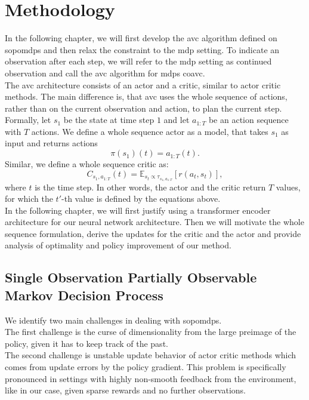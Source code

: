 
\chapter{Methodology}
\label{chapter:Methodology}
In the following chapter, we will first develop the \ac{avc} algorithm defined on \ac{sopomdp}s and then relax 
the constraint to the \ac{mdp} setting. To indicate an observation after each step, we will refer to the \ac{mdp} setting as continued observation 
and call the \ac{avc} algorithm for \ac{mdp}s \ac{coavc}.\\

The \ac{avc} architecture consists of an actor and a critic, similar to actor critic methods. The main difference is, that \ac{avc} uses the whole sequence of 
actions, rather than on the current observation and action, to plan the current step.\\ 

Formally, let $s_{1}$ be the state at time step $1$ and let $a_{1:T}$ be an action sequence with $T$ actions. 
We define a whole sequence actor as a model, that takes $s_{1}$ as input and returns actions 
\begin{equation}
    \label{eq:def_wsa}
    \pi(s_{1})(t) = a_{1:T}(t).
\end{equation}
Similar, we define a whole sequence critic as: 
\begin{equation}
    \label{eq:def_wsc}
    C_{s_1, a_{1:T}}(t) = \mathbb{E}_{s_t \propto \tau_{s_1, a_{1:T}}}\left[r(a_t, s_t)\right],
\end{equation}
where $t$ is the time step. In other words, the actor and the critic return $T$ values, for which the $t'$-th value is defined by the 
equations above.\\

In the following chapter, we will first justify using a transformer encoder architecture for our neural network architecture. 
Then we will motivate the whole sequence formulation, derive the updates for the critic and the 
actor and provide analysis of optimality and policy improvement of our method. 

\section{Single Observation Partially Observable Markov Decision Process}
We identify two main challenges in dealing with \ac{sopomdp}s. \\
The first challenge is the curse of dimensionality from the large preimage of the policy, given it has to keep track 
of the past. \\
The second challenge is unstable update behavior of actor critic methods which comes from update errors by the policy gradient. This problem 
is specifically pronounced in settings with highly non-smooth feedback from the environment, like in our case, given sparse rewards 
and no further observations.
